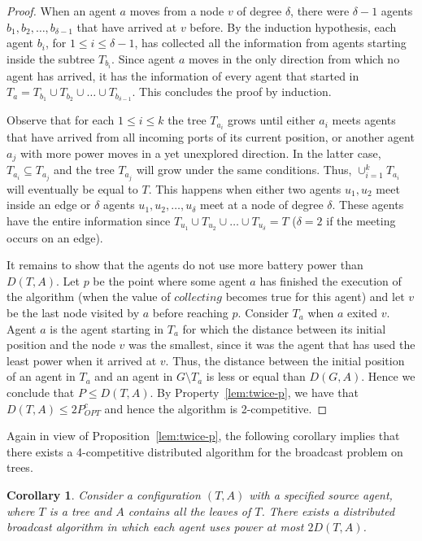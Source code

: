 \documentclass{article}
\newtheorem{corollary}{Corollary}
\begin{document}
\begin{proof}
  When an agent $a$ moves from a node $v$ of degree $\delta$, there were $\delta - 1$ agents $b_1,b_2,\dots,b_{\delta - 1}$ that have arrived at $v$ before. By the induction hypothesis, each agent $b_i$, for $1\leq i\leq \delta-1$, has collected all the information from agents starting inside the subtree $T_{b_i}$. Since agent $a$ moves in the only direction from which no agent has arrived, it has the information of every agent that started in $T_{a}=T_{b_1}\cup T_{b_2}\cup\dots\cup T_{b_{\delta - 1}}$. This concludes the proof by induction.

Observe that for each $1\leq i\leq k$  the tree $T_{a_i}$ grows until either $a_i$ meets agents that have arrived from all incoming ports of its current position, or another agent $a_j$ with more power moves in a yet unexplored direction. In the latter case, $T_{a_i}\subseteq T_{a_j}$ and the tree $T_{a_j}$ will grow under the same conditions. Thus, $\cup_{i=1}^{k}T_{a_i}$ will eventually be equal to $T$. This happens when either two agents $u_1,u_2$ meet inside an edge or $\delta$ agents $u_1,u_2,\dots,u_\delta$ meet at a node of degree $\delta$. These agents have the entire information since  $T_{u_1}\cup T_{u_2}\cup\dots\cup T_{u_\delta}=T$ ($\delta =2$ if the meeting occurs on an edge). 

It remains to show that the agents do not use more battery power than $D(T,A)$. 
Let $p$ be the point where some agent $a$ has finished the execution of the algorithm (when the value of $collecting$ becomes true for this agent) and let $v$ be the last node visited by $a$ before reaching $p$. Consider $T_a$ when $a$ exited $v$. Agent $a$ is the agent starting in $T_a$ for which the distance between its initial position and the node $v$ was the smallest, since it was the agent that has used the least power when it arrived at $v$.  Thus, the distance between the initial position of an agent in $T_a$ and an agent in $G\setminus T_a$ is less or equal than $D(G,A)$. Hence we conclude that $P\leq D(T,A)$. By Property~\ref{lem:twice-p}, we have that $D(T,A)\leq 2P_{OPT}^c$ and hence the algorithm is 2-competitive.
\end{proof}

Again in view of Proposition~\ref{lem:twice-p}, the following corollary implies that there exists 	a 4-competitive distributed algorithm for the broadcast problem on trees.

\begin{corollary}\label{cor:FourComp}
Consider a configuration $(T,A)$ with a specified source agent, where $T$ is a tree and $A$ contains all the leaves of $T$. There exists a distributed broadcast algorithm in which each agent uses power at most $2D(T,A)$.
\end{corollary}
\end{document}
